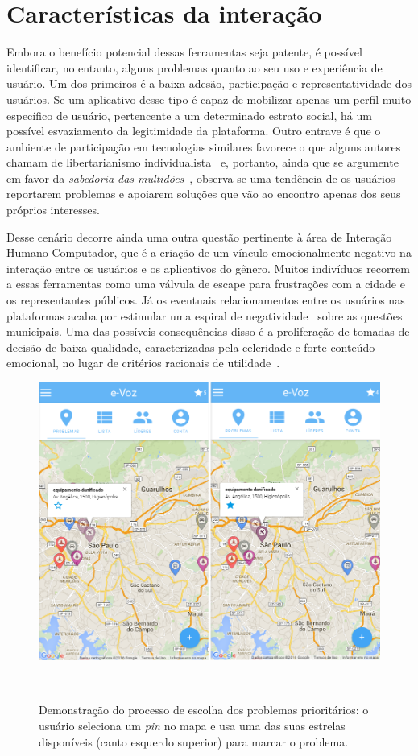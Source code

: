 \documentclass{sigchi}
\begin{document}
\section{Características da interação}
Embora o benefício potencial dessas ferramentas seja patente, é possível identificar, no entanto, alguns problemas quanto ao seu uso e experiência de usuário. Um dos primeiros é a baixa adesão, participação e representatividade dos usuários. Se um aplicativo desse tipo é capaz de mobilizar apenas um perfil muito específico de usuário, pertencente a um determinado estrato social, há um possível esvaziamento da legitimidade da plataforma. Outro entrave é que o ambiente de participação em tecnologias similares favorece o que alguns autores chamam de libertarianismo individualista~\cite{brabham:2008} e, portanto, ainda que se argumente em favor da \textit{sabedoria das multidões}~\cite{surowiecki:2005}, observa-se uma tendência de os usuários reportarem problemas e apoiarem soluções que vão ao encontro apenas dos seus próprios interesses.

Desse cenário decorre ainda uma outra questão pertinente à área de Interação Humano-Computador, que é a criação de um vínculo emocionalmente negativo na interação entre os usuários e os aplicativos do gênero. Muitos indivíduos recorrem a essas ferramentas como uma válvula de escape para frustrações com a cidade e os representantes públicos. Já os eventuais relacionamentos entre os usuários nas plataformas acaba por estimular uma espiral de negatividade~\cite{slater:2007} sobre as questões municipais. Uma das possíveis consequências disso é a proliferação de tomadas de decisão de baixa qualidade, caracterizadas pela celeridade e forte conteúdo emocional, no lugar de critérios racionais de utilidade~\cite{tversky:1986}.

\begin{figure}
	\centering
	\includegraphics[width=0.88\columnwidth]{figures/prototipo1a}
	\caption{Demonstração do processo de escolha dos problemas prioritários: o usuário seleciona um \textit{pin} no mapa e usa uma das suas estrelas disponíveis (canto esquerdo superior) para marcar o problema. }~\label{fig:figure1}
\end{figure}
\end{document}
